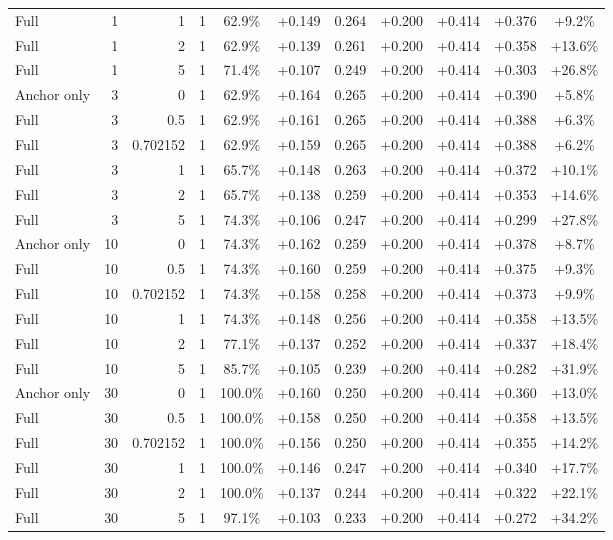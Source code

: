 \begin{table}[htbp]
\begin{tabular}{lrrrccccccc}
Full & 1 & 1 & 1 & 62.9\% & +0.149 & 0.264 & +0.200 & +0.414 & +0.376 & +9.2\% \\
Full & 1 & 2 & 1 & 62.9\% & +0.139 & 0.261 & +0.200 & +0.414 & +0.358 & +13.6\% \\
Full & 1 & 5 & 1 & 71.4\% & +0.107 & 0.249 & +0.200 & +0.414 & +0.303 & +26.8\% \\
Anchor only & 3 & 0 & 1 & 62.9\% & +0.164 & 0.265 & +0.200 & +0.414 & +0.390 & +5.8\% \\
Full & 3 & 0.5 & 1 & 62.9\% & +0.161 & 0.265 & +0.200 & +0.414 & +0.388 & +6.3\% \\
Full & 3 & 0.702152 & 1 & 62.9\% & +0.159 & 0.265 & +0.200 & +0.414 & +0.388 & +6.2\% \\
Full & 3 & 1 & 1 & 65.7\% & +0.148 & 0.263 & +0.200 & +0.414 & +0.372 & +10.1\% \\
Full & 3 & 2 & 1 & 65.7\% & +0.138 & 0.259 & +0.200 & +0.414 & +0.353 & +14.6\% \\
Full & 3 & 5 & 1 & 74.3\% & +0.106 & 0.247 & +0.200 & +0.414 & +0.299 & +27.8\% \\
Anchor only & 10 & 0 & 1 & 74.3\% & +0.162 & 0.259 & +0.200 & +0.414 & +0.378 & +8.7\% \\
Full & 10 & 0.5 & 1 & 74.3\% & +0.160 & 0.259 & +0.200 & +0.414 & +0.375 & +9.3\% \\
Full & 10 & 0.702152 & 1 & 74.3\% & +0.158 & 0.258 & +0.200 & +0.414 & +0.373 & +9.9\% \\
Full & 10 & 1 & 1 & 74.3\% & +0.148 & 0.256 & +0.200 & +0.414 & +0.358 & +13.5\% \\
Full & 10 & 2 & 1 & 77.1\% & +0.137 & 0.252 & +0.200 & +0.414 & +0.337 & +18.4\% \\
Full & 10 & 5 & 1 & 85.7\% & +0.105 & 0.239 & +0.200 & +0.414 & +0.282 & +31.9\% \\
Anchor only & 30 & 0 & 1 & 100.0\% & +0.160 & 0.250 & +0.200 & +0.414 & +0.360 & +13.0\% \\
Full & 30 & 0.5 & 1 & 100.0\% & +0.158 & 0.250 & +0.200 & +0.414 & +0.358 & +13.5\% \\
Full & 30 & 0.702152 & 1 & 100.0\% & +0.156 & 0.250 & +0.200 & +0.414 & +0.355 & +14.2\% \\
Full & 30 & 1 & 1 & 100.0\% & +0.146 & 0.247 & +0.200 & +0.414 & +0.340 & +17.7\% \\
Full & 30 & 2 & 1 & 100.0\% & +0.137 & 0.244 & +0.200 & +0.414 & +0.322 & +22.1\% \\
Full & 30 & 5 & 1 & 97.1\% & +0.103 & 0.233 & +0.200 & +0.414 & +0.272 & +34.2\% \\

\end{tabular}
\end{table}
